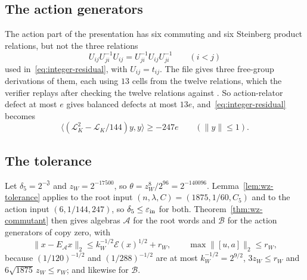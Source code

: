 \documentclass[11pt]{article}
\newcommand{\eps}{\varepsilon}
\newcommand{\cJ}{\mathfrak J}
\begin{document}
\subsection*{The action generators}
The action part of the presentation has six commuting and six Steinberg product relations, but not the three relations
\[
 U_{ij}U_{ji}^{-1}U_{ij}=U_{ji}^{-1}U_{ij}U_{ji}^{-1}\qquad(i<j)
\]
used in~\eqref{eq:integer-residual}, with $U_{ij}=t_{ij}$.  The file  gives three free-group derivations of them, each using $13$ cells from the twelve relations, which the verifier replays after checking the twelve relations against .  So action-relator defect at most $e$ gives balanced defects at most $13e$, and~\eqref{eq:integer-residual} becomes
\begin{equation}\label{eq:f5integer}
 \langle(\mathcal L_K^2-\mathcal L_K/144)y,y\rangle\ge-247e\qquad(\|y\|\le1).
\end{equation}

\subsection*{The tolerance}
Let $\delta_5=2^{-\cJ}$ and $z_W=2^{-17500}$, so $\theta=z_W^8/2^{96}=2^{-140096}$.  Lemma~\ref{lem:wz-tolerance} applies to the root input $(n,\lambda,C)=(1875,1/60,C_5)$ and to the action input $(6,1/144,247)$, so $\delta_5\le\eps_{\rm in}$ for both.  Theorem~\ref{thm:wz-commutant} then gives algebras $\mathcal A$ for the root words and $\mathcal B$ for the action generators of copy zero, with
\[
 \|x-E_{\mathcal A}x\|_2\le k_W^{-1/2}\mathcal E(x)^{1/2}+r_W,\qquad \max\|[u,a]\|_2\le r_W,
\]
because $(1/120)^{-1/2}$ and $(1/288)^{-1/2}$ are at most $k_W^{-1/2}=2^{9/2}$, $3z_W\le r_W$ and $6\sqrt{1875}\,z_W\le r_W$; and likewise for $\mathcal B$.
\end{document}
